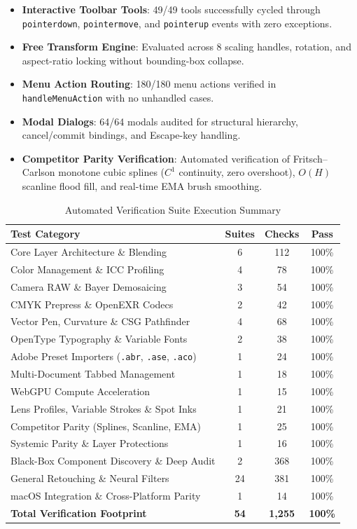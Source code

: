 \documentclass[10pt,journal,compsoc]{IEEEtran}
\begin{document}
\begin{itemize}
    \item \textbf{Interactive Toolbar Tools}: 49/49 tools successfully cycled through \texttt{pointerdown}, \texttt{pointermove}, and \texttt{pointerup} events with zero exceptions.
    \item \textbf{Free Transform Engine}: Evaluated across 8 scaling handles, rotation, and aspect-ratio locking without bounding-box collapse.
    \item \textbf{Menu Action Routing}: 180/180 menu actions verified in \texttt{handleMenuAction} with no unhandled cases.
    \item \textbf{Modal Dialogs}: 64/64 modals audited for structural hierarchy, cancel/commit bindings, and Escape-key handling.
    \item \textbf{Competitor Parity Verification}: Automated verification of Fritsch--Carlson monotone cubic splines ($C^1$ continuity, zero overshoot), $O(H)$ scanline flood fill, and real-time EMA brush smoothing.
\end{itemize}

\begin{table}[!t]
\centering
\caption{Automated Verification Suite Execution Summary}
\label{tab:test_summary}
\footnotesize
\begin{tabularx}{\columnwidth}{@{}>{\raggedright\arraybackslash}Xccc@{}}
\toprule
\textbf{Test Category} & \textbf{Suites} & \textbf{Checks} & \textbf{Pass} \\
\midrule
Core Layer Architecture \& Blending & 6 & 112 & 100\% \\
Color Management \& ICC Profiling & 4 & 78 & 100\% \\
Camera RAW \& Bayer Demosaicing & 3 & 54 & 100\% \\
CMYK Prepress \& OpenEXR Codecs & 2 & 42 & 100\% \\
Vector Pen, Curvature \& CSG Pathfinder & 4 & 68 & 100\% \\
OpenType Typography \& Variable Fonts & 2 & 38 & 100\% \\
Adobe Preset Importers (\texttt{.abr}, \texttt{.ase}, \texttt{.aco}) & 1 & 24 & 100\% \\
Multi-Document Tabbed Management & 1 & 18 & 100\% \\
WebGPU Compute Acceleration & 1 & 15 & 100\% \\
Lens Profiles, Variable Strokes \& Spot Inks & 1 & 21 & 100\% \\
Competitor Parity (Splines, Scanline, EMA) & 1 & 25 & 100\% \\
Systemic Parity \& Layer Protections & 1 & 16 & 100\% \\
Black-Box Component Discovery \& Deep Audit & 2 & 368 & 100\% \\
General Retouching \& Neural Filters & 24 & 381 & 100\% \\
macOS Integration \& Cross-Platform Parity & 1 & 14 & 100\% \\
\midrule
\textbf{Total Verification Footprint} & \textbf{54} & \textbf{1,255} & \textbf{100\%} \\
\bottomrule
\end{tabularx}
\end{table}
\end{document}
